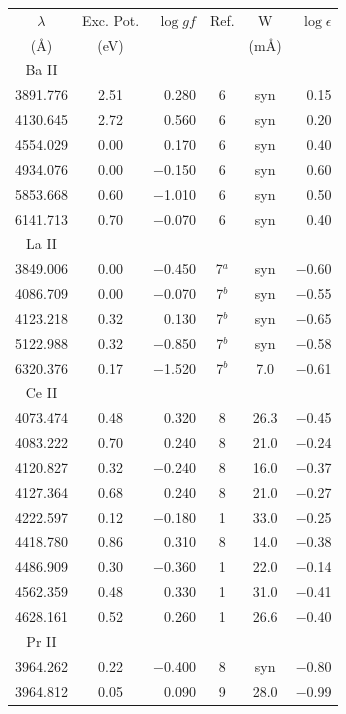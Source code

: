 \documentclass{aa}
\begin{document}
\begin{table}
\begin{tabular}{ccrccr}
\hline\hline
$\lambda$ & Exc. Pot. & $\log gf$ & Ref. & W & $\log \epsilon$ \\
  (\AA)   & (eV)      &           &      & (m\AA) &              \\ 
\hline
Ba II\\
\hline
3891.776 & 2.51 &    0.280 & 6 & syn  &    0.15\\
4130.645 & 2.72 &    0.560 & 6 & syn  &    0.20\\
4554.029 & 0.00 &    0.170 & 6 & syn  &    0.40\\
4934.076 & 0.00 & $-$0.150 & 6 & syn  &    0.60\\
5853.668 & 0.60 & $-$1.010 & 6 & syn  &    0.50\\
6141.713 & 0.70 & $-$0.070 & 6 & syn  &    0.40\\
\hline
La II\\
\hline
3849.006 & 0.00 & $-$0.450 & 7$^{a}$ & syn  & $-$0.60\\
4086.709 & 0.00 & $-$0.070 & 7$^{b}$ & syn  & $-$0.55\\
4123.218 & 0.32 &    0.130 & 7$^{b}$ & syn  & $-$0.65\\
5122.988 & 0.32 & $-$0.850 & 7$^{b}$ & syn  & $-$0.58\\
6320.376 & 0.17 & $-$1.520 & 7$^{b}$ & 7.0  & $-$0.61\\
\hline
Ce II\\
\hline
4073.474 & 0.48 &    0.320 & 8 &  26.3 & $-$0.45\\
4083.222 & 0.70 &    0.240 & 8 &  21.0 & $-$0.24\\
4120.827 & 0.32 & $-$0.240 & 8 &  16.0 & $-$0.37\\
4127.364 & 0.68 &    0.240 & 8 &  21.0 & $-$0.27\\
4222.597 & 0.12 & $-$0.180 & 1 &  33.0 & $-$0.25\\
4418.780 & 0.86 &    0.310 & 8 &  14.0 & $-$0.38\\
4486.909 & 0.30 & $-$0.360 & 1 &  22.0 & $-$0.14\\
4562.359 & 0.48 &    0.330 & 1 &  31.0 & $-$0.41\\
4628.161 & 0.52 &    0.260 & 1 &  26.6 & $-$0.40\\
\hline
Pr II\\
\hline
3964.262 & 0.22 & $-$0.400 & 8  &  syn  & $-$0.80\\
3964.812 & 0.05 &    0.090 & 9  &  28.0 & $-$0.99\\

\end{tabular}
\end{table}
\end{document}
